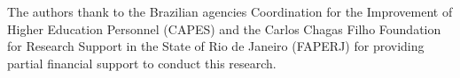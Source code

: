 \documentclass[journal=iecred,manuscript=article]{achemso}
\theoremstyle{definition}
\theoremstyle{remark}
\begin{document}
\begin{acknowledgement}

The authors thank to the Brazilian agencies Coordination for the Improvement of Higher Education Personnel (CAPES) and the Carlos Chagas Filho Foundation for Research Support in the State of Rio de Janeiro (FAPERJ) for providing partial financial support to conduct this research.

\end{acknowledgement}


\end{document}
